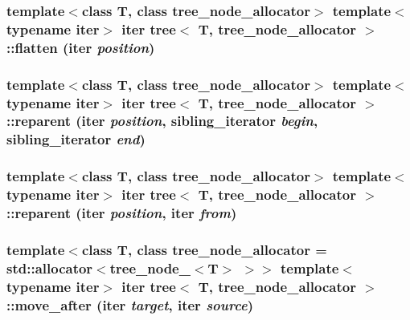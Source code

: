 \hypertarget{classtree_479c8e3f748608a9b9fb91e58e18998c}{
\subsubsection{\setlength{\rightskip}{0pt plus 5cm}template$<$class T, class tree\_\-node\_\-allocator$>$ template$<$typename iter$>$ iter {\bf tree}$<$ T, tree\_\-node\_\-allocator $>$::flatten (iter {\em position})}}
\label{classtree_479c8e3f748608a9b9fb91e58e18998c}


\hypertarget{classtree_32b88523e2d5b6c78381b7da9455be5e}{
\subsubsection{\setlength{\rightskip}{0pt plus 5cm}template$<$class T, class tree\_\-node\_\-allocator$>$ template$<$typename iter$>$ iter {\bf tree}$<$ T, tree\_\-node\_\-allocator $>$::reparent (iter {\em position}, \/  {\bf sibling\_\-iterator} {\em begin}, \/  {\bf sibling\_\-iterator} {\em end})}}
\label{classtree_32b88523e2d5b6c78381b7da9455be5e}


\hypertarget{classtree_021a394ff7139df8573e2cb80e6beaa2}{
\subsubsection{\setlength{\rightskip}{0pt plus 5cm}template$<$class T, class tree\_\-node\_\-allocator$>$ template$<$typename iter$>$ iter {\bf tree}$<$ T, tree\_\-node\_\-allocator $>$::reparent (iter {\em position}, \/  iter {\em from})}}
\label{classtree_021a394ff7139df8573e2cb80e6beaa2}


\hypertarget{classtree_e7f72ba46cd061f71720c731b4a9bf63}{
\subsubsection{\setlength{\rightskip}{0pt plus 5cm}template$<$class T, class tree\_\-node\_\-allocator = std::allocator$<$tree\_\-node\_\-$<$T$>$ $>$$>$ template$<$typename iter$>$ iter {\bf tree}$<$ T, tree\_\-node\_\-allocator $>$::move\_\-after (iter {\em target}, \/  iter {\em source})}}
\label{classtree_e7f72ba46cd061f71720c731b4a9bf63}


